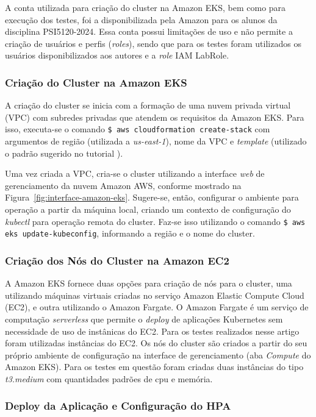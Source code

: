 \documentclass[12pt]{article}
\begin{document}
A conta utilizada para criação do cluster na Amazon EKS, bem como para execução dos testes, foi a disponibilizada pela Amazon para os alunos da disciplina PSI5120-2024. Essa conta possui limitações de uso e não permite a criação de usuários e perfis (\textit{roles}), sendo que para os testes foram utilizados os usuários disponibilizados aos autores e a \textit{role} IAM LabRole.

\subsubsection{Criação do Cluster na Amazon EKS}

A criação do cluster se inicia com a formação de uma nuvem privada virtual (VPC) com subredes privadas que atendem os requisitos da Amazon EKS. Para isso, executa-se o comando \verb|$ aws cloudformation create-stack| com argumentos de região (utilizada a \textit{us-east-1}), nome da VPC e \textit{template} (utilizado o padrão sugerido no tutorial \cite{amazon_getting_nodate}).

Uma vez criada a VPC, cria-se o cluster utilizando a interface \textit{web} de gerenciamento da nuvem Amazon AWS, conforme mostrado na Figura~\ref{fig:interface-amazon-eks}. Sugere-se, então, configurar o ambiente para operação a partir da máquina local, criando um contexto de configuração do \textit{kubectl} para operação remota do cluster. Faz-se isso utilizando o comando \verb|$ aws eks update-kubeconfig|, informando a região e o nome do cluster.

\subsubsection{Criação dos Nós do Cluster na Amazon EC2}

A Amazon EKS fornece duas opções para criação de nós para o cluster, uma utilizando máquinas virtuais criadas no serviço Amazon Elastic Compute Cloud (EC2), e outra utilizando o Amazon Fargate. O Amazon Fargate é um serviço de computação \textit{serverless} que permite o \textit{deploy} de aplicações Kubernetes sem necessidade de uso de instânicas do EC2. Para os testes realizados nesse artigo foram utilizadas instâncias do EC2. Os nós do cluster são criados a partir do seu próprio ambiente de configuração na interface de gerenciamento (aba \textit{Compute} do Amazon EKS). Para os testes em questão foram criadas duas instâncias do tipo \textit{t3.medium} com quantidades padrões de cpu e memória.

\subsubsection{Deploy da Aplicação e Configuração do HPA}
\end{document}
